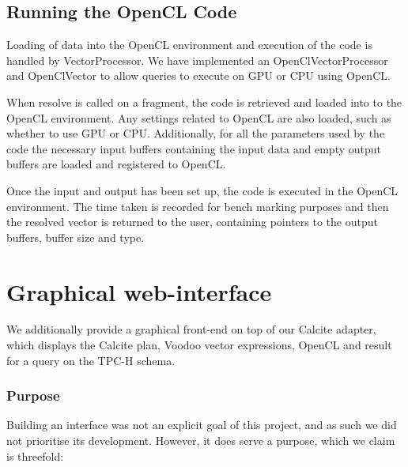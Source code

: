 \subsection{Running the OpenCL Code}
Loading of data into the OpenCL environment and execution of the code is handled by VectorProcessor. We have implemented an OpenClVectorProcessor and OpenClVector to allow queries to execute on GPU or CPU using OpenCL.

When resolve is called on a fragment, the code is retrieved and loaded into to the OpenCL environment. Any settings related to OpenCL are also loaded, such as whether to use GPU or CPU. Additionally, for all the parameters used by the code the necessary input buffers containing the input data and empty output buffers are loaded and registered to OpenCL.

Once the input and output has been set up, the code is executed in the OpenCL environment. The time taken is recorded for bench marking purposes and then the resolved vector is returned to the user, containing pointers to the output buffers, buffer size and type.

\section{Graphical web-interface}

We additionally provide a graphical front-end on top of our Calcite adapter, which displays the Calcite plan, Voodoo vector expressions, OpenCL and result for a query on the TPC-H schema.

\subsubsection{Purpose}

Building an interface was not an explicit goal of this project, and as such we did not prioritise its development. However, it does serve a purpose, which we claim is threefold:

